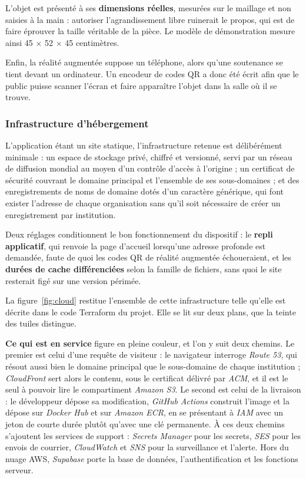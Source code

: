 L'objet est présenté à ses \textbf{dimensions réelles}, mesurées sur le maillage
et non saisies à la main : autoriser l'agrandissement libre ruinerait le propos,
qui est de faire éprouver la taille véritable de la pièce. Le modèle de
démonstration mesure ainsi 45 $\times$ 52 $\times$ 45 centimètres.

Enfin, la réalité augmentée suppose un téléphone, alors qu'une soutenance se
tient devant un ordinateur. Un encodeur de codes QR a donc été écrit afin que le
public puisse scanner l'écran et faire apparaître l'objet dans la salle où il se
trouve.

\subsubsection{Infrastructure d'hébergement}

L'application étant un site statique, l'infrastructure retenue est délibérément
minimale : un espace de stockage privé, chiffré et versionné, servi par un
réseau de diffusion mondial au moyen d'un contrôle d'accès à l'origine ; un
certificat de sécurité couvrant le domaine principal et l'ensemble de ses
sous-domaines ; et des enregistrements de noms de domaine dotés d'un caractère
générique, qui font exister l'adresse de chaque organisation sans qu'il soit
nécessaire de créer un enregistrement par institution.

Deux réglages conditionnent le bon fonctionnement du dispositif : le
\textbf{repli applicatif}, qui renvoie la page d'accueil lorsqu'une adresse
profonde est demandée, faute de quoi les codes QR de réalité augmentée
échoueraient, et les \textbf{durées de cache différenciées} selon la famille de
fichiers, sans quoi le site resterait figé sur une version périmée.

La figure~\ref{fig:cloud} restitue l'ensemble de cette infrastructure telle
qu'elle est décrite dans le code Terraform du projet. Elle se lit sur deux
plans, que la teinte des tuiles distingue.

\textbf{Ce qui est en service} figure en pleine couleur, et l'on y suit deux
chemins. Le premier est celui d'une requête de visiteur : le navigateur
interroge \emph{Route 53}, qui résout aussi bien le domaine principal que le
sous-domaine de chaque institution ; \emph{CloudFront} sert alors le contenu,
sous le certificat délivré par \emph{ACM}, et il est le seul à pouvoir lire le
compartiment \emph{Amazon S3}. Le second est celui de la livraison : le
développeur dépose sa modification, \emph{GitHub Actions} construit l'image et
la dépose sur \emph{Docker Hub} et sur \emph{Amazon ECR}, en se présentant à
\emph{IAM} avec un jeton de courte durée plutôt qu'avec une clé permanente. À
ces deux chemins s'ajoutent les services de support : \emph{Secrets Manager}
pour les secrets, \emph{SES} pour les envois de courrier, \emph{CloudWatch} et
\emph{SNS} pour la surveillance et l'alerte. Hors du nuage AWS, \emph{Supabase}
porte la base de données, l'authentification et les fonctions serveur.

